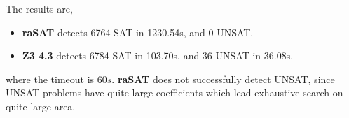 The results are, 
\begin{itemize}
\item {\bf raSAT} detects 6764 SAT in 1230.54s, and 0 UNSAT. 
\item {\bf Z3 4.3} detects 6784 SAT in 103.70s, and 36 UNSAT in 36.08s. 
\end{itemize}
where the timeout is $60s$. 
{\bf raSAT} does not successfully detect UNSAT, since UNSAT problems have quite large coefficients
which lead exhaustive search on quite large area. 
